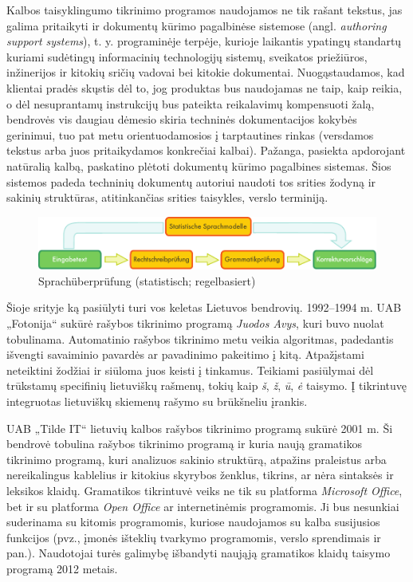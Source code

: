 \documentclass[]{../metanetpaper}
\begin{document}
\begin{multicols}{2}

Kalbos taisyklingumo tikrinimo programos naudojamos ne tik rašant tekstus, jas galima pritaikyti ir dokumentų kūrimo pagalbinėse sistemose (angl. \textit{authoring support systems}), t. y. programinėje terpėje, kurioje laikantis ypatingų standartų kuriami sudėtingų informacinių technologijų sistemų, sveikatos priežiūros, inžinerijos ir kitokių sričių vadovai bei kitokie dokumentai. Nuogąstaudamos, kad klientai pradės skųstis dėl to, jog produktas bus naudojamas ne taip, kaip reikia, o dėl nesuprantamų instrukcijų bus pateikta reikalavimų kompensuoti žalą, bendrovės vis daugiau dėmesio skiria techninės dokumentacijos kokybės gerinimui, tuo pat metu orientuodamosios į tarptautines rinkas (versdamos tekstus arba juos pritaikydamos konkrečiai kalbai). Pažanga, pasiekta apdorojant natūralią kalbą, paskatino plėtoti dokumentų kūrimo pagalbines sistemas. Šios sistemos padeda techninių dokumentų autoriui naudoti tos srities žodyną ir sakinių struktūras, atitinkančias srities taisykles, verslo terminiją.

\begin{figure}[htb]
  \center
  \includegraphics[width=\textwidth]{../_media/german/language_checking}
  \caption{Sprachüberprüfung (statistisch; regelbasiert)}
  \label{fig:langcheckingaarch_de}
\end{figure}

Šioje srityje ką pasiūlyti turi vos keletas Lietuvos bendrovių. 1992–1994 m. UAB „Fotonija“ sukūrė rašybos tikrinimo programą \textit{Juodos Avys}, kuri buvo nuolat tobulinama. Automatinio rašybos tikrinimo metu veikia algoritmas, padedantis išvengti savaiminio pavardės ar pavadinimo pakeitimo į kitą. Atpažįstami neteiktini žodžiai ir siūloma juos keisti į tinkamus. Teikiami pasiūlymai dėl trūkstamų specifinių lietuviškų rašmenų, tokių kaip \textit{š}, \textit{ž},  \textit{ū}, \textit{ė} taisymo. Į tikrintuvę integruotas lietuviškų skiemenų rašymo su brūkšneliu įrankis.   

    UAB „Tilde IT“  lietuvių kalbos rašybos tikrinimo programą sukūrė 2001 m. Ši bendrovė tobulina rašybos tikrinimo programą ir kuria naują gramatikos tikrinimo programą, kuri analizuos sakinio struktūrą, atpažins praleistus arba nereikalingus kablelius ir kitokius skyrybos ženklus, tikrins, ar nėra sintaksės ir leksikos klaidų. Gramatikos tikrintuvė veiks ne tik su platforma \textit{Microsoft Office}, bet ir su platforma \textit{Open Office} ar internetinėmis programomis. Ji bus nesunkiai suderinama su kitomis programomis, kuriose naudojamos su kalba susijusios funkcijos (pvz., įmonės išteklių tvarkymo programomis, verslo sprendimais ir pan.). Naudotojai turės galimybę išbandyti naująją gramatikos klaidų taisymo programą 2012 metais.   


\end{multicols}
\end{document}
